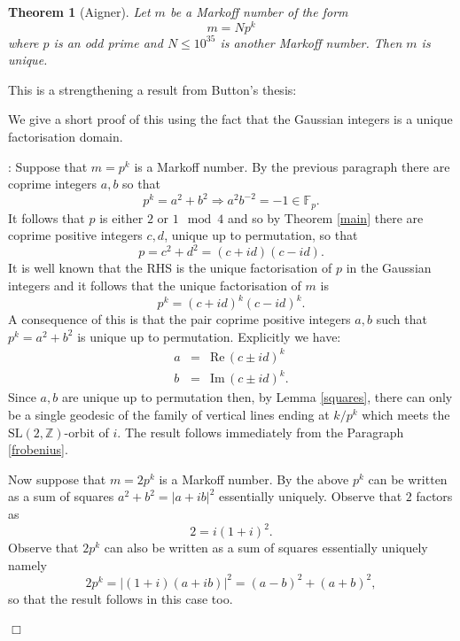 \documentclass[14pt,a4paper]{amsart}
\newtheorem{thm}{Theorem}[section]
\def\ZZ{\mathbb{Z}}
\def\fp{\mathbb{F}_p}
\def\sl2{\mathrm{SL}(2, \ZZ)}
\begin{document}
  \begin{thm}[Aigner]
  Let $m$ be a Markoff number of the form 
  $$m =Np^k$$
  where $p$ is an odd prime and $N \leq 10^{35}$ is another Markoff number. Then $m$ is unique.
  \end{thm}
 
  This is a strengthening a result from Button's thesis:
 

 We give a short proof of this using the fact that the Gaussian integers
  is a unique factorisation domain.

 \proof: Suppose that $m=p^k$ is a Markoff number. By the previous paragraph there are coprime integers $a,b$ so that 
 $$p^k = a^2 + b^2 \Rightarrow a^2b^{-2} = -1 \in \fp.$$
 It follows that $p$ is either $2$ or $1 \mod 4$ and 
 so by Theorem \ref{main} there are coprime positive integers $c,d$,
  unique up to permutation,
 so that  $$p = c^2 + d^2 = (c + id)(c - id).$$
 It is well known that the RHS is the unique factorisation of $p$ in the Gaussian integers
 and it follows that the unique factorisation of $m$ is
 $$p^k = (c + id)^k(c - id)^k.$$
 A consequence of this is that the pair coprime positive integers $a,b$ such that $p^k = a^2 + b^2$
 is unique up to permutation. Explicitly we have:
 \begin{eqnarray}
 a &=& \mathrm{Re}\, (c\pm id)^k \\
 b &=& \mathrm{Im}\, (c\pm id)^k.
 \end{eqnarray}
 Since $a,b$ are unique up to permutation 
 then, by Lemma \ref{squares},
  there can only be a single  geodesic of the family
 of vertical lines ending at  
 $k/p^k$ which meets the $\sl2$-orbit of $i$.
 The result follows immediately from the  Paragraph \ref{frobenius}.

 Now suppose that  $m=2p^k$ is a Markoff number.
 By the above  $p^k$ can be written as a sum of squares $a^2 + b^2 = |a + ib|^2$ 
 essentially uniquely.
 Observe that   $2$ factors as 
 $$ 2 = i(1+i)^2.$$
 Observe that $2 p^k$ can also  be written as a sum of squares
 essentially uniquely namely
 $$2p^k = |(1+i) (a + ib) |^2 =  (a-b)^2 + (a+b)^2,$$ 
 so that the result follows in this case too.

 \hfill $\Box$
\end{document}
